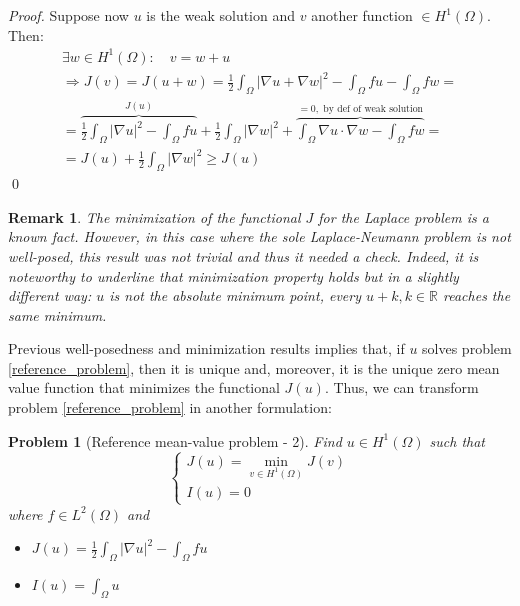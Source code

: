 \documentclass[a4paper,11pt]{article}
\newtheorem{problem}{Problem}
\newtheorem*{remark}{Remark}
\begin{document}
\begin{proof}
     \noindent Suppose now $u$ is the weak solution and $v$ another function $\in H^1(\Omega)$. Then:
     \begin{equation*}
     \begin{gathered}
     \exists w \in H^1(\Omega): \quad v = w+u \\
     \Rightarrow J(v)=J(u+w)= \frac{1}{2}\int_{\Omega}|\nabla u + \nabla w|^2 - \int_{\Omega}{fu}- \int_{\Omega}{fw} = \\
     = \overbrace{\frac{1}{2}\int_{\Omega}|\nabla u|^2 - \int_{\Omega}{fu}}^{J(u)} + \frac{1}{2}\int_{\Omega}|\nabla w|^2 + \overbrace{\int_{\Omega}\nabla u \cdot \nabla w - \int_{\Omega}{fw}}^{=0, \text { by def of weak solution}} =\\
     = J(u) + \frac{1}{2}\int_{\Omega}|\nabla w| ^2 \geq J(u)
     \end{gathered}
     \end{equation*}
     \qed
\end{proof}

\begin{remark}
	The minimization of the functional $J$ for the Laplace problem is a known fact. However, in this case where the sole Laplace-Neumann problem is not well-posed, this result was not trivial and thus it needed a check. Indeed, it is noteworthy to underline that minimization property holds but in a slightly different way: $u$ is not the absolute minimum point, every $u+k, k\in\mathbb{R}$ reaches the same minimum.
\end{remark}\vspace{4mm}

\noindent Previous well-posedness and minimization results implies that, if $u$ solves problem \ref{reference_problem}, then it is unique and, moreover, it is the unique zero mean value function that minimizes the functional $J(u)$. Thus, we can transform problem \ref{reference_problem} in another formulation:\\

\begin{problem}[Reference mean-value problem - 2] \label{reference_problem_2} Find $u\in H^1(\Omega)$ such that
	\begin{equation*}
	\begin{cases}
	J(u)=\displaystyle \min_{v\in H^1(\Omega)} J(v)\\
	I(u) = 0
	\end{cases}
	\end{equation*}
 where $f\in L^2(\Omega)$ and  \vspace{2mm}
	\begin{itemize}
		\item $J(u) = \frac{1}{2}\int_{\Omega} |\nabla u |^2 - \int_{\Omega}fu$
		\item $I(u) = \int_{\Omega} u $
	\end{itemize}
\end{problem}\vspace{3mm}
\end{document}

